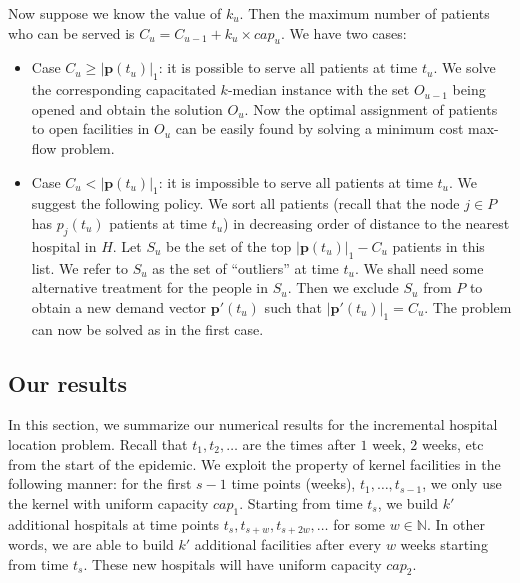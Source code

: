 Now suppose we know the value of $k_u$. Then the maximum number of patients who can be served is $C_u = C_{u-1} + k_u \times cap_u$. We have two cases:
\begin{itemize}
	\item Case $C_u \geq |\mathbf{p}(t_u)|_1$: it is possible to serve all patients at time $t_u$. We solve the corresponding capacitated $k$-median instance with the set $O_{u-1}$ being opened and obtain the solution $O_u$. Now the optimal assignment of patients to open facilities in $O_u$ can be easily found by solving a minimum cost max-flow problem.
	
	\item Case $C_u < |\mathbf{p}(t_u)|_1$: it is impossible to serve all patients at time $t_u$. We suggest the following policy. We sort all patients (recall that the node $j \in P$ has $p_j(t_u)$ patients at time $t_u$) in decreasing order of distance to the nearest hospital in $H$. Let $S_u$ be the set of the top $|\mathbf{p}(t_u)|_1 - C_u$ patients in this list. We refer to $S_u$ as the set of ``outliers'' at time $t_u$. We shall need some alternative treatment for the people in $S_u$. Then we exclude $S_u$ from $P$ to obtain a new demand vector $\mathbf{p}'(t_u)$ such that $|\mathbf{p}'(t_u)|_1 = C_u$. The problem can now be solved as in the first case.
	
\end{itemize}








\newpage
\subsection{Our results}
In this section, we summarize our numerical results for the incremental hospital location problem. Recall that $t_1, t_2, \ldots$ are the times after $1$ week, $2$ weeks, etc from the start of the epidemic. We exploit the property of kernel facilities in the following manner: for the first $s-1$ time points (weeks), $t_1, \ldots, t_{s-1}$, we only use the kernel with uniform capacity $cap_1$. Starting from time $t_{s}$, we build $k'$ additional hospitals at time points  $t_s, t_{s+w}, t_{s+2w}, \ldots$ for some $w \in \mathbb{N}$. In other words, we are able to build $k'$ additional facilities after every $w$ weeks starting from time $t_s$. These new hospitals will have uniform capacity $cap_2$.


